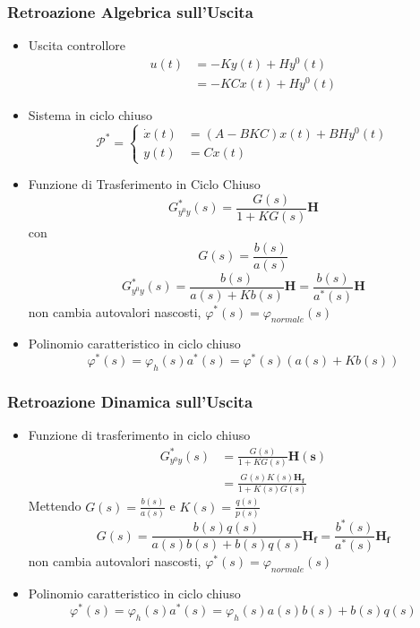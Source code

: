\documentclass{article}
\begin{document}
\subsubsection{Retroazione Algebrica sull'Uscita}
\begin{itemize}
\item Uscita controllore
  \begin{align*}
    u(t) &= -Ky(t) + H y^0 (t) \\
    &= -KCx(t) + Hy^0 (t)
  \end{align*}
\item Sistema in ciclo chiuso
  \[ \mathcal{P}^{\ast} = \begin{cases}
    \dot{x}(t) &= (A-BKC)x(t) + BHy^0 (t) \\
    y(t) &= Cx(t)
  \end{cases} \]
\item Funzione di Trasferimento in Ciclo Chiuso
  \[ G^{\ast} _{y^0 y} (s) = \frac{G(s)}{1+ KG(s)} \mathbf{H}\]
  con
  \[ G(s) = \frac{b(s)}{a(s)} \]
  \[ G^{\ast} _{y^0 y} (s)
  = \frac{b(s)}{a(s) + Kb(s)} \mathbf{H}
  = \frac{b(s)}{a^{\ast}(s)} \mathbf{H}\]
  non cambia autovalori nascosti, $\varphi ^{\ast} (s) = \varphi_{normale} (s)$
\item Polinomio caratteristico in ciclo chiuso
  \[ \varphi ^{\ast} (s) = \varphi_{h} (s) a^{\ast} (s)
  = \varphi ^{\ast} (s) (a(s) + Kb(s)) \]
\end{itemize}

\subsubsection{Retroazione Dinamica sull'Uscita}
\begin{itemize}
\item Funzione di trasferimento in ciclo chiuso
  \begin{align*}
    G^{\ast} _{y^0 y}(s) &= \frac{G(s)}{1 + KG(s)} \mathbf{H(s)} \\
    &= \frac{G(s)K(s) \mathbf{H_f}}{1 + K(s)G(s)}
  \end{align*}
  Mettendo $G(s) = \frac{b(s)}{a(s)}$ e $K(s) = \frac{q(s)}{p(s)}$ 
  \[ G(s) = \frac{b(s)q(s)}{a(s)b(s) + b(s)q(s)} \mathbf{H_f} =
  \frac{b^{\ast}(s)}{a^{\ast}(s)} \mathbf{H_f} \]
  non cambia autovalori nascosti, $\varphi ^{\ast} (s) = \varphi_{normale} (s)$
\item Polinomio caratteristico in ciclo chiuso
  \[ \varphi ^{\ast} (s) = \varphi_h (s) a^{\ast} (s)
  = \varphi _h (s) a(s)b(s) + b(s)q(s) \]
\end{itemize}
\end{document}
